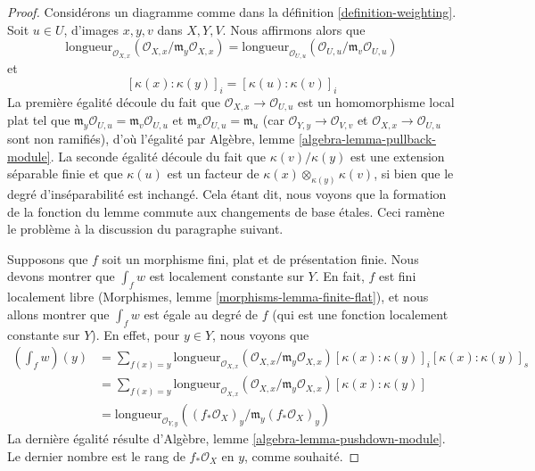 \begin{proof}
Considérons un diagramme comme dans la définition \ref{definition-weighting}.
Soit $u \in U$, d'images $x, y, v$ dans $X, Y, V$. Nous affirmons alors que
$$
\text{longueur}_{\mathcal{O}_{X, x}}
(\mathcal{O}_{X, x}/\mathfrak m_y \mathcal{O}_{X, x}) =
\text{longueur}_{\mathcal{O}_{U, u}}
(\mathcal{O}_{U, u}/\mathfrak m_v \mathcal{O}_{U, u})
$$
et
$$
[\kappa(x) : \kappa(y)]_i =
[\kappa(u) : \kappa(v)]_i
$$
La première égalité découle du fait que $\mathcal{O}_{X, x} \to \mathcal{O}_{U, u}$
est un homomorphisme local plat tel que
$\mathfrak m_y \mathcal{O}_{U, u} = \mathfrak m_v \mathcal{O}_{U, u}$
et $\mathfrak m_x \mathcal{O}_{U, u} = \mathfrak m_u$
(car $\mathcal{O}_{Y, y} \to \mathcal{O}_{V, v}$ et
$\mathcal{O}_{X, x} \to \mathcal{O}_{U, u}$ sont non ramifiés),
d'où l'égalité par Algèbre, lemme \ref{algebra-lemma-pullback-module}.
La seconde égalité découle du fait que $\kappa(v)/\kappa(y)$ est une extension
séparable finie et que $\kappa(u)$ est un facteur de
$\kappa(x) \otimes_{\kappa(y)} \kappa(v)$, si bien que le degré
d'inséparabilité est inchangé. Cela étant dit, nous voyons que la formation
de la fonction du lemme commute aux changements de base \'etales.
Ceci ramène le problème à la discussion du paragraphe suivant.

\medskip\noindent
Supposons que $f$ soit un morphisme fini, plat et de présentation finie.
Nous devons montrer que $\int_f w$ est localement constante sur $Y$.
En fait, $f$ est fini localement libre
(Morphismes, lemme \ref{morphisms-lemma-finite-flat}),
et nous allons montrer que $\int_f w$ est égale au degré de $f$
(qui est une fonction localement constante sur $Y$). En effet,
pour $y \in Y$, nous voyons que
\begin{align*}
(\textstyle{\int}_f w)(y)
& =
\sum\nolimits_{f(x) = y}
\text{longueur}_{\mathcal{O}_{X, x}}
(\mathcal{O}_{X, x}/\mathfrak m_y \mathcal{O}_{X, x})
[\kappa(x) : \kappa(y)]_i
[\kappa(x) : \kappa(y)]_s \\
& =
\sum\nolimits_{f(x) = y}
\text{longueur}_{\mathcal{O}_{X, x}}
(\mathcal{O}_{X, x}/\mathfrak m_y \mathcal{O}_{X, x})
[\kappa(x) : \kappa(y)] \\
& =
\text{longueur}_{\mathcal{O}_{Y, y}}((f_*\mathcal{O}_X)_y/
\mathfrak m_y (f_*\mathcal{O}_X)_y)
\end{align*}
La dernière égalité résulte d'Algèbre, lemme \ref{algebra-lemma-pushdown-module}.
Le dernier nombre est le rang de $f_*\mathcal{O}_X$ en $y$, comme souhaité.
\end{proof}

